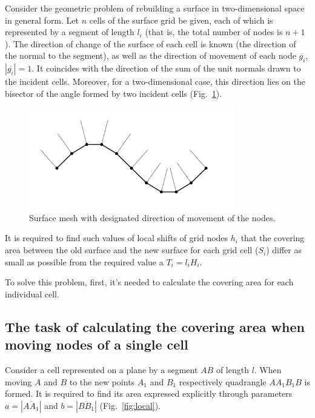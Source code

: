 \documentclass[
11pt,%
tightenlines,%
twoside,%
onecolumn,%
nofloats,%
nobibnotes,%
nofootinbib,%
superscriptaddress,%
noshowpacs,%
centertags]%
{revtex4}
\begin{document}
Consider the geometric problem of rebuilding a surface in two-dimensional space in general form.
Let $n$ cells of the surface grid be given, each of which is represented by a segment of length $l_i$ (that is, the total number of nodes is $n+1$).
The direction of change of the surface of each cell is known (the direction of the normal to the segment), as well as the direction of movement of each node $\overline{g_i}$, $|\overline{g_i}| = 1$.
It coincides with the direction of the sum of the unit normals drawn to the incident cells.
Moreover, for a two-dimensional case, this direction lies on the bisector of the angle formed by two incident cells \cite{Fortin} (Fig.~\ref{fig:grid_normals}).

\begin{figure}[h]
\setcaptionmargin{5mm}
\onelinecaptionstrue
\includegraphics[width=0.8\textwidth]{pics/grid_normals.pdf}
\caption{Surface mesh with designated direction of movement of the nodes.}
\label{fig:grid_normals}
\end{figure}

It is required to find such values of local shifts of grid nodes $h_i$ that the covering area between the old surface and the new surface for each grid cell ($S_i$) differ as small as possible from the required value a $T_i = l_iH_i$.

To solve this problem, first, it's needed to calculate the covering area for each individual cell.

\subsection{The task of calculating the covering area when moving nodes of a single cell}

Consider a cell represented on a plane by a segment $AB$ of length $l$.
When moving $A$ and $B$ to the new points $A_1$ and $B_1$ respectively quadrangle $AA_1B_1B$ is formed.
It is required to find its area expressed explicitly through parameters $a = |\overline{AA_1}|$ and $b = |\overline{BB_1}|$ (Fig.~\ref{fig:local}).
\end{document}
